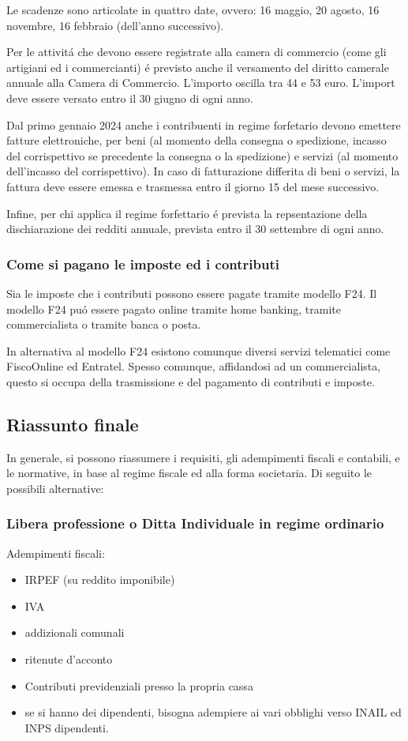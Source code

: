 \documentclass{article}
\begin{document}
Le scadenze sono articolate in quattro date, ovvero: 16 maggio, 20 agosto, 16 novembre, 16 febbraio (dell'anno successivo).

Per le attivit\'a che devono essere registrate alla camera di commercio (come gli artigiani ed i commercianti) \'e previsto anche il versamento del diritto camerale annuale alla Camera di Commercio. L'importo oscilla tra 44 e 53 euro. L'import deve essere versato entro il 30 giugno di ogni anno.

Dal primo gennaio 2024 anche i contribuenti in regime forfetario devono emettere fatture elettroniche, per beni (al momento della consegna o spedizione, incasso del corrispettivo se precedente la consegna o la spedizione)
e servizi (al momento dell'incasso del corrispettivo). In caso di fatturazione differita di beni o servizi, la fattura deve essere emessa e trasmessa entro il giorno 15 del mese successivo.

Infine, per chi applica il regime forfettario \'e prevista la repsentazione della dischiarazione dei redditi annuale, prevista entro il 30 settembre di ogni anno. 

\subsubsection{Come si pagano le imposte ed i contributi}
Sia le imposte che i contributi possono essere pagate tramite modello F24. 
Il modello F24 pu\'o essere pagato online tramite home banking, tramite commercialista o tramite banca o posta.

In alternativa al modello F24 esistono comunque diversi servizi telematici come FiscoOnline ed Entratel. Spesso comunque, affidandosi ad un commercialista, questo si occupa della trasmissione e del pagamento di contributi e imposte.


\subsection{Riassunto finale}

In generale, si possono riassumere i requisiti, gli adempimenti fiscali e contabili, e le normative, in base al regime fiscale ed alla forma societaria. Di seguito le possibili alternative:

\subsubsection{Libera professione o Ditta Individuale in regime ordinario}
Adempimenti fiscali:
\begin{itemize}
    \item IRPEF (su reddito imponibile)
    \item IVA
    \item addizionali comunali
    \item ritenute d'acconto
    \item Contributi previdenziali presso la propria cassa
    \item se si hanno dei dipendenti, bisogna adempiere ai vari obblighi verso INAIL ed INPS dipendenti.
\end{itemize}
\end{document}
